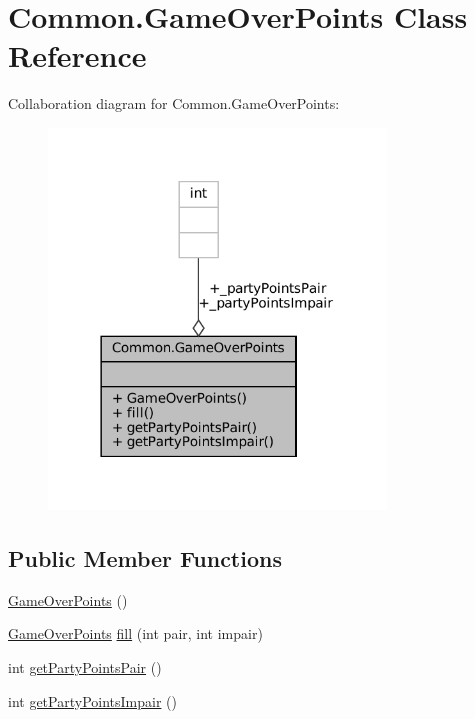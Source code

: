 \hypertarget{classCommon_1_1GameOverPoints}{}\section{Common.\+Game\+Over\+Points Class Reference}
\label{classCommon_1_1GameOverPoints}


Collaboration diagram for Common.\+Game\+Over\+Points\+:
\nopagebreak
\begin{figure}[H]
\begin{center}
\leavevmode
\includegraphics[width=254pt]{classCommon_1_1GameOverPoints__coll__graph}
\end{center}
\end{figure}
\subsection*{Public Member Functions}
\begin{DoxyCompactItemize}
\item 
\mbox{\hyperlink{classCommon_1_1GameOverPoints_afd6a3a2856a80e9a787ede65388d80d1}{Game\+Over\+Points}} ()
\item 
\mbox{\hyperlink{classCommon_1_1GameOverPoints}{Game\+Over\+Points}} \mbox{\hyperlink{classCommon_1_1GameOverPoints_a469f01f2db6a2e36783f9728cd91e090}{fill}} (int pair, int impair)
\item 
int \mbox{\hyperlink{classCommon_1_1GameOverPoints_a8fbb500e2039a56e94402295de1716fe}{get\+Party\+Points\+Pair}} ()
\item 
int \mbox{\hyperlink{classCommon_1_1GameOverPoints_a32908cf1b364274c562e122aedcba2ab}{get\+Party\+Points\+Impair}} ()
\end{DoxyCompactItemize}
